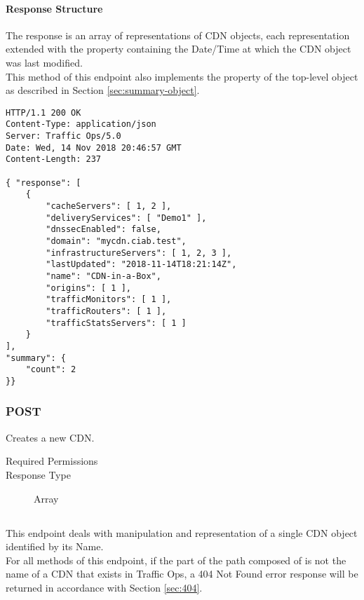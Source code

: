 \paragraph{Response Structure}
The response is an array of representations of CDN objects, each representation
extended with the  property containing the Date/Time at which
the CDN object was last modified.\\
This method of this endpoint also implements the  property of the
top-level  object as described in Section
\ref{sec:summary-object}.

\begin{codelisting}
\begin{verbatim}
HTTP/1.1 200 OK
Content-Type: application/json
Server: Traffic Ops/5.0
Date: Wed, 14 Nov 2018 20:46:57 GMT
Content-Length: 237

{ "response": [
	{
		"cacheServers": [ 1, 2 ],
		"deliveryServices": [ "Demo1" ],
		"dnssecEnabled": false,
		"domain": "mycdn.ciab.test",
		"infrastructureServers": [ 1, 2, 3 ],
		"lastUpdated": "2018-11-14T18:21:14Z",
		"name": "CDN-in-a-Box",
		"origins": [ 1 ],
		"trafficMonitors": [ 1 ],
		"trafficRouters": [ 1 ],
		"trafficStatsServers": [ 1 ]
	}
],
"summary": {
	"count": 2
}}
\end{verbatim}
\end{codelisting}

\subsubsection{POST}
Creates a new CDN.
\begin{description}
	\item[Required Permissions] 
	\item[Response Type] Array
\end{description}

\subsection{}
This endpoint deals with manipulation and representation of a single CDN object
identified by its Name.\\
For all methods of this endpoint, if the part of the path composed of
 is not the name of a CDN that exists in Traffic Ops, a 404 Not
Found error response will be returned in accordance with Section \ref{sec:404}.

\subsection{}
